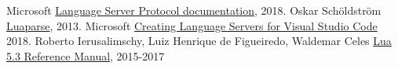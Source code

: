  Microsoft \href{https://microsoft.github.io/language-server-protocol/specification#initialize}{Language Server Protocol documentation}, 2018.
 Oskar Schöldström \href{https://oxyc.github.io/luaparse/}{Luaparse}, 2013.
 Microsoft \href{https://code.visualstudio.com/docs/extensions/example-language-server}{Creating Language Servers for Visual Studio Code} 2018.
 Roberto Ierusalimschy, Luiz Henrique de Figueiredo, Waldemar Celes \href{https://www.lua.org/manual/5.3/manual.html}{Lua 5.3 Reference Manual}, 2015-2017

